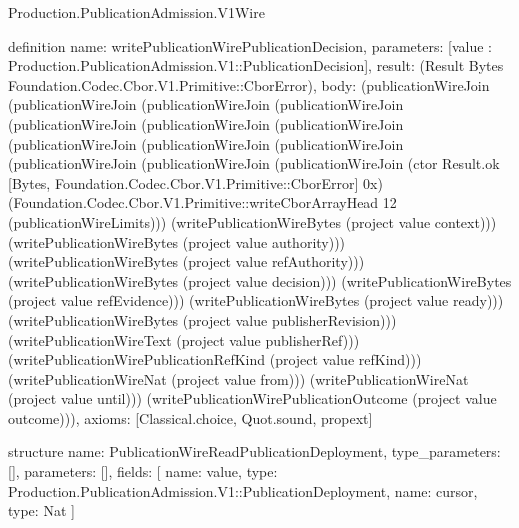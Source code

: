 \begin{lexlean}{Production.PublicationAdmission.V1Wire}
\begin{semanticmodule}
definition{
  name: writePublicationWirePublicationDecision,
  parameters: [value : Production.PublicationAdmission.V1::PublicationDecision],
  result: (Result Bytes Foundation.Codec.Cbor.V1.Primitive::CborError),
  body: (publicationWireJoin (publicationWireJoin (publicationWireJoin (publicationWireJoin (publicationWireJoin (publicationWireJoin (publicationWireJoin (publicationWireJoin (publicationWireJoin (publicationWireJoin (publicationWireJoin (publicationWireJoin (publicationWireJoin (ctor Result.ok [Bytes, Foundation.Codec.Cbor.V1.Primitive::CborError] 0x) (Foundation.Codec.Cbor.V1.Primitive::writeCborArrayHead 12 (publicationWireLimits))) (writePublicationWireBytes (project value context))) (writePublicationWireBytes (project value authority))) (writePublicationWireBytes (project value refAuthority))) (writePublicationWireBytes (project value decision))) (writePublicationWireBytes (project value refEvidence))) (writePublicationWireBytes (project value ready))) (writePublicationWireBytes (project value publisherRevision))) (writePublicationWireText (project value publisherRef))) (writePublicationWirePublicationRefKind (project value refKind))) (writePublicationWireNat (project value from))) (writePublicationWireNat (project value until))) (writePublicationWirePublicationOutcome (project value outcome))),
  axioms: [Classical.choice, Quot.sound, propext]
}

structure{
  name: PublicationWireReadPublicationDeployment,
  type_parameters: [],
  parameters: [],
  fields: [
    {name: value, type: Production.PublicationAdmission.V1::PublicationDeployment},
    {name: cursor, type: Nat}
  ]
}


\end{semanticmodule}
\end{lexlean}

